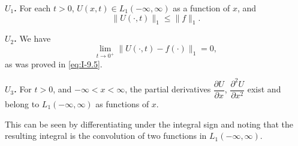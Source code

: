 \noindent\textbf{$U_1$.} For each $t>0$, $U(x,t)\in L_1(-\infty,\infty)$ as a function of $x$, and
\begin{equation*}
\|U(\cdot,t)\|_1\le\|f\|_1.
\end{equation*}

\noindent\textbf{$U_2$.} We have
\begin{equation*}
\lim_{t\to 0^+}\|U(\cdot,t)-f(\cdot)\|_1=0,
\end{equation*}
as was proved in \eqref{eq:I-9.5}.

\noindent\textbf{$U_3$.} For $t>0$, and $-\infty<x<\infty$, the partial derivatives $\dfrac{\partial U}{\partial x}$, $\dfrac{\partial^{2}U}{\partial x^{2}}$ exist and belong to $L_1(-\infty,\infty)$ as functions of $x$.

This can be seen by differentiating under the integral sign and noting that the resulting integral is the convolution of two functions in $L_1(-\infty,\infty)$.

